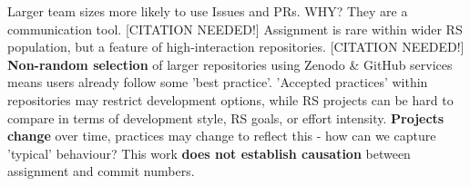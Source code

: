 \documentclass[25pt, a0paper, landscape, margin=10mm, innermargin=15mm, blockverticalspace=10mm, subcolspace=7mm, dvipsnames]{tikzposter} %
\begin{document}
\begin{columns}
{{    %
    Larger team sizes more likely to use Issues and PRs. WHY? They are a communication tool. [CITATION NEEDED!] 
    Assignment is rare within wider RS population, but a feature of high-interaction repositories.
    [CITATION NEEDED!]     
    \newline
    \vspace*{0.4em} 
    \textbf{Non-random selection} of larger repositories using Zenodo \& GitHub services means users already follow some 'best practice'.  
    'Accepted practices' within repositories may restrict development options, while RS projects can be hard to compare in terms of development style, RS goals, or effort intensity.
    \textbf{Projects change} over time, practices may change to reflect this - how can we capture 'typical' behaviour?  
    This work \textbf{does not establish causation} between assignment and commit numbers. 
    }
}
\end{columns}
\end{document}

